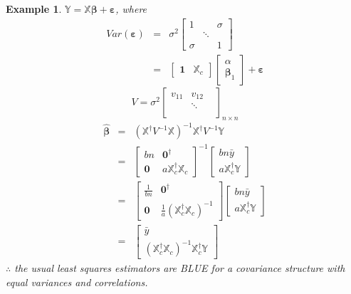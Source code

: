 \documentclass{article}
\newtheorem{example}[theorem]{Example}
\begin{document}
\begin{example}
$\mathbb{Y}=\mathbb{X}\boldsymbol{\beta }+\boldsymbol{\varepsilon }$, where%
\begin{eqnarray*}
Var\left( \boldsymbol{\varepsilon }\right) &=&\sigma ^{2}\left[ 
\begin{array}{ccc}
1 &  & \sigma \\ 
& \ddots &  \\ 
\sigma &  & 1%
\end{array}%
\right] \\
&=&\left[ 
\begin{array}{cc}
\boldsymbol{1} & \mathbb{X}_{c}%
\end{array}%
\right] \left[ 
\begin{array}{c}
\alpha \\ 
\boldsymbol{\beta }_{1}%
\end{array}%
\right] +\boldsymbol{\varepsilon }
\end{eqnarray*}%
\begin{equation*}
V=\sigma ^{2}\left[ 
\begin{array}{ccc}
v_{11} & v_{12} &  \\ 
& \ddots &  \\ 
&  & 
\end{array}%
\right] _{n\times n}
\end{equation*}%
\begin{eqnarray*}
\boldsymbol{\hat{\beta}} &=&\left( \mathbb{X}^{\dagger }V^{-1}\mathbb{X}%
\right) ^{-1}\mathbb{X}^{\dagger }V^{-1}\mathbb{Y} \\
&=&\left[ 
\begin{array}{cc}
bn & \boldsymbol{0}^{\dagger } \\ 
\boldsymbol{0} & a\mathbb{X}_{c}^{\dagger }\mathbb{X}_{c}%
\end{array}%
\right] ^{-1}\left[ 
\begin{array}{c}
bn\bar{y} \\ 
a\mathbb{X}_{c}^{\dagger }\mathbb{Y}%
\end{array}%
\right] \\
&=&\left[ 
\begin{array}{cc}
\frac{1}{bn} & \boldsymbol{0}^{\dagger } \\ 
\boldsymbol{0} & \frac{1}{a}\left( \mathbb{X}_{c}^{\dagger }\mathbb{X}%
_{c}\right) ^{-1}%
\end{array}%
\right] \left[ 
\begin{array}{c}
bn\bar{y} \\ 
a\mathbb{X}_{c}^{\dagger }\mathbb{Y}%
\end{array}%
\right] \\
&=&\left[ 
\begin{array}{c}
\bar{y} \\ 
\left( \mathbb{X}_{c}^{\dagger }\mathbb{X}_{c}\right) ^{-1}\mathbb{X}%
_{c}^{\dagger }\mathbb{Y}%
\end{array}%
\right]
\end{eqnarray*}%
$\therefore $ the usual least squares estimators are BLUE for a covariance
structure with equal variances and correlations.
\end{example}
\end{document}
